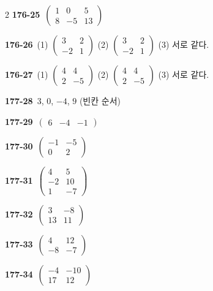 \documentclass[10pt,a4paper]{article}
\begin{document}
\begin{multicols}{2}
\noindent\textbf{176-25}\ $\begin{pmatrix} 1 & 0 & 5 \\ 8 & -5 & 13 \end{pmatrix}$\par
\noindent\textbf{176-26}\ (1) $\begin{pmatrix} 3 & 2 \\ -2 & 1 \end{pmatrix}$ (2) $\begin{pmatrix} 3 & 2 \\ -2 & 1 \end{pmatrix}$ (3) 서로 같다.\par
\noindent\textbf{176-27}\ (1) $\begin{pmatrix} 4 & 4 \\ 2 & -5 \end{pmatrix}$ (2) $\begin{pmatrix} 4 & 4 \\ 2 & -5 \end{pmatrix}$ (3) 서로 같다.\par
\noindent\textbf{177-28}\ $3$, $0$, $-4$, $9$ (빈칸 순서)\par
\noindent\textbf{177-29}\ $\begin{pmatrix} 6 & -4 & -1 \end{pmatrix}$\par
\noindent\textbf{177-30}\ $\begin{pmatrix} -1 & -5 \\ 0 & 2 \end{pmatrix}$\par
\noindent\textbf{177-31}\ $\begin{pmatrix} 4 & 5 \\ -2 & 10 \\ 1 & -7 \end{pmatrix}$\par
\noindent\textbf{177-32}\ $\begin{pmatrix} 3 & -8 \\ 13 & 11 \end{pmatrix}$\par
\noindent\textbf{177-33}\ $\begin{pmatrix} 4 & 12 \\ -8 & -7 \end{pmatrix}$\par
\noindent\textbf{177-34}\ $\begin{pmatrix} -4 & -10 \\ 17 & 12 \end{pmatrix}$\par

\end{multicols}
\end{document}
